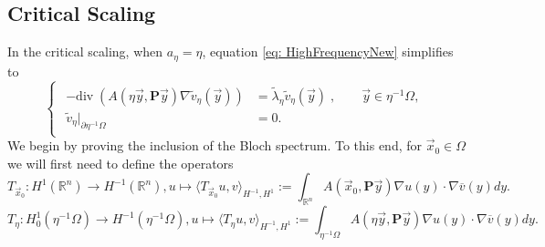 \documentclass[a4paper,reqno]{amsart}
\numberwithin{equation}{section}
\numberwithin{equation}{section}		%
\numberwithin{figure}{section}			%
\numberwithin{table}{section}				%
\theoremstyle{definition}
\renewcommand{\tilde}{\widetilde}
\newcommand{\<}{\ensuremath \leq}
\renewcommand{\>}{\ensuremath \geq}
\renewcommand{\tilde}{\widetilde}
\begin{document}
\subsection{Critical Scaling}\label{sec:critical}
In the critical scaling, when $a_\eta = \eta$, equation \eqref{eq: HighFrequencyNew} simplifies to
\begin{equation}\label{eq: HighFrequencyCritical}
    \begin{cases}
        \begin{aligned}
          - \mathrm{div} \; \left( A\left( \eta \vec{y},\textbf{P} \vec{y} \right) \nabla \tilde{v}_\eta({\vec y}) \right ) & = \tilde{\lambda}_\eta\tilde{v}_\eta({\vec y}) \;, \qquad \vec{y} \in \eta^{-1}\Omega,\\
            \tilde{v}_\eta|_{\partial \eta^{-1}\Omega} & = 0.
        \end{aligned}
    \end{cases}
\end{equation}
We begin by proving the inclusion of the Bloch spectrum. To this end, for $\vec x_0 \in \Omega$ we will first need to define the operators
 \begin{equation}
     T_{\vec{x}_0}: H^1(\mathbb{R}^n)\rightarrow H^{-1}(\mathbb{R}^n), u\mapsto \langle T_{\vec{x}_0}u,v \rangle_{H^{-1},H^{1}}:=\int_{\mathbb{R}^n}A\left( \vec{x}_0, \textbf{P}\vec{y}\right)\nabla u(y) \cdot \nabla \overline{v}(y) dy.
 \end{equation}
 \begin{equation}
     T_\eta: H^1_0(\eta^{-1}\Omega)\rightarrow H^{-1}(\eta^{-1}\Omega), u\mapsto \langle T_{\eta}u,v \rangle_{H^{-1},H^{1}}:=\int_{\eta^{-1}\Omega}A\left( \eta\vec{y}, \textbf{P}\vec{y}\right)\nabla u(y) \cdot \nabla \overline{v}(y) dy .
 \end{equation}
\end{document}
